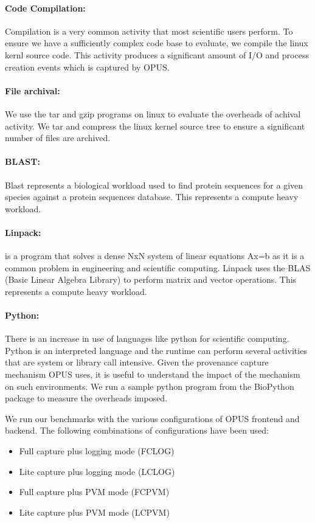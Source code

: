 \documentclass[withindex,glossary]{cam-thesis}
\begin{document}
\paragraph{Code Compilation:} Compilation is a very common activity that most scientific users perform.
To ensure we have a sufficiently complex code base to evaluate, we compile the linux kernl source code.
This activity produces a significant amount of I/O and process creation events which is captured by OPUS. 

\paragraph{File archival:} We use the tar and gzip programs on linux to evaluate the overheads of achival activity.
We tar and compress the linux kernel source tree to ensure a significant number of files are archived.

\paragraph{BLAST:} Blast represents a biological workload used to find protein sequences for a given species against a protein sequences database.
This represents a compute heavy workload.

\paragraph{Linpack:} is a program that solves a dense NxN system of linear equations Ax=b as it is a common problem in engineering and scientific computing.
Linpack uses the BLAS (Basic Linear Algebra Library) to perform matrix and vector operations.
This represents a compute heavy workload.

\paragraph{Python:} There is an increase in use of languages like python for scientific computing.
Python is an interpreted language and the runtime can perform several activities that are system or library call intensive.
Given the provenance capture mechanism OPUS uses, it is useful to understand the impact of the mechanism on such environments.
We run a sample python program from the BioPython package to measure the overheads imposed.

We run our benchmarks with the various configurations of OPUS frontend and backend.
The following combinations of configurations have been used:
\begin{itemize}
\item Full capture plus logging mode (FCLOG)
\item Lite capture plus logging mode (LCLOG)
\item Full capture plus PVM mode (FCPVM)
\item Lite capture plus PVM mode (LCPVM)
\end{itemize}
\end{document}
